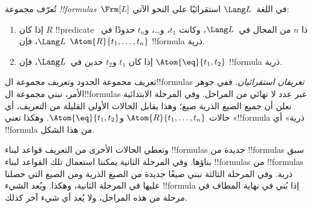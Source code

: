 \documentclass[../../../include/open-logic-section]{subfiles}
\begin{document}
\begin{defn}[الصيغ]
تُعرّف مجموعة \emph{!!{formula}s}~$\Frm[L]$ في اللغة~$\Lang L$
استقرائيًا على النحو الآتي:
\begin{enumerate}


\item إذا كان $R$ !!{predicate} ذا $n$ من المحال في~$\Lang L$، وكانت
  $t_1$، و\dots، و$t_n$ حدودًا في~$\Lang L$، فإن
  $\Atom{R}{t_1,\ldots, t_n}$ !!{formula} ذرية.

\item إذا كان $t_1$ و$t_2$ حدين في~$\Lang L$، فإن
  $\Atom{\eq}{t_1, t_2}$ !!{formula} ذرية.








\end{enumerate}
\end{defn}

\begin{explain}
تعريف مجموعة الحدود وتعريف مجموعة ال!!{formula}s
\emph{تعريفان استقرائيان}. ففي جوهر الأمر، نبني مجموعة
ال!!{formula}s عبر عدد لا نهائي من المراحل. وفي المرحلة الابتدائية
نعلن أن جميع الصيغ الذرية صيغ؛ وهذا يقابل الحالات الأولى القليلة من
التعريف، أي حالات
%
%
$\Atom{R}{t_1,\dots,t_n}$ و$\Atom{\eq}{t_1,t_2}$. وهكذا تعني
«!!{formula} ذرية» أي !!{formula} من هذا الشكل.

وتعطي الحالات الأخرى من التعريف قواعد لبناء !!{formula}s جديدة من
!!{formula}s سبق بناؤها. وفي المرحلة الثانية يمكننا استعمال تلك
القواعد لبناء !!{formula}s من !!{formula}s ذرية. وفي المرحلة الثالثة
نبني صيغًا جديدة من الصيغ الذرية ومن الصيغ التي حصلنا عليها في
المرحلة الثانية، وهكذا. ويُعد الشيء !!{formula} إذا بُني في نهاية
المطاف في مرحلة من هذه المراحل، ولا يُعد أي شيء آخر كذلك.
\end{explain}
\end{document}
